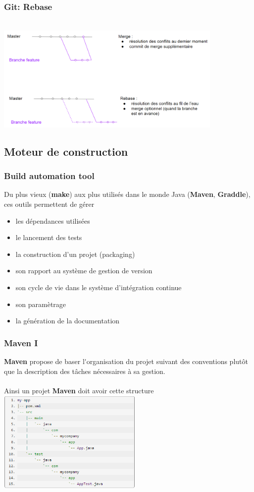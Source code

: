 \begin{frame}
	\frametitle{Git: Rebase}
	~\\
	\includegraphics[width=11cm]{img/git_rebase.png}
    ~\\
\end{frame}

\subsection{Moteur de construction}
\begin{frame}
	\frametitle{Build automation tool}
Du plus vieux (\textbf{make}) aux plus utilis\'{e}s dans le monde Java (\textbf{Maven}, \textbf{Graddle}), ces outils permettent de g\'{e}rer
~
\begin{itemize}
      \item les d\'{e}pendances utilis\'{e}es
      \item le lancement des tests
      \item la construction d'un projet (packaging)
      \item son rapport au syst\`{e}me de gestion de version
      \item son cycle de vie dans le syst\`{e}me d'int\'{e}gration continue
      \item son param\`{e}trage
      \item la g\'{e}n\'{e}ration de la documentation
    \end{itemize}
\end{frame}

\begin{frame}
	\frametitle{Maven I}
	\textbf{Maven} propose de baser l\'{}organisation du projet suivant des conventions plut\^{o}t que la description des t\^{a}ches n\'{e}cessaires \`{a} sa gestion.
	\\~\\
    Ainsi un projet \textbf{Maven} doit avoir cette structure
    \\
    \includegraphics[width=7cm]{img/maven_structure.png}
\end{frame}


